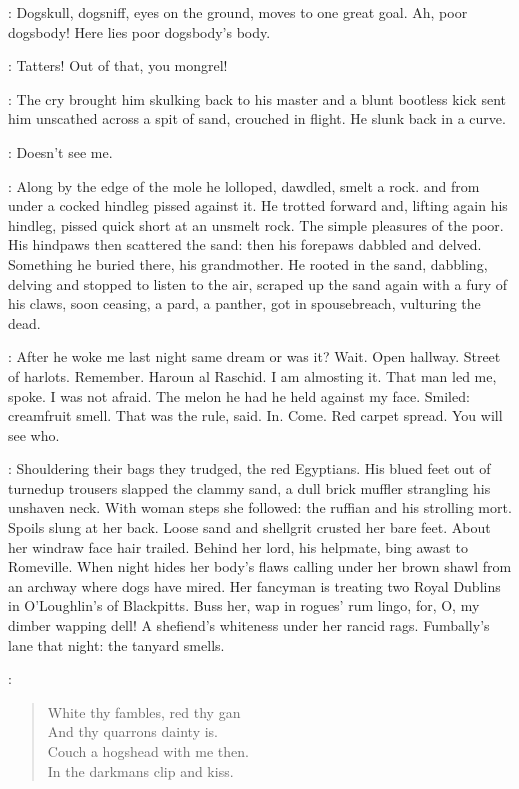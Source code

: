 \StephenInt:
Dogskull, dogsniff,
eyes on the ground,
moves to one great goal.
Ah, poor dogsbody!
Here lies poor dogsbody's body.

\man:
Tatters!
Out of that, you mongrel!

:
The cry brought him skulking back to his master
and a blunt bootless kick sent him unscathed
across a spit of sand, crouched in flight.
He slunk back in a curve.

\StephenInt:
Doesn't see me.

:
Along by the edge of the mole
he lolloped, dawdled, smelt a rock.
and from under a cocked hindleg
pissed against it.
He trotted forward and, lifting again his hindleg,
pissed quick short at an unsmelt rock.
The simple pleasures of the poor.
His hindpaws then scattered the sand:
then his forepaws dabbled and delved.
Something he buried there, his grandmother.
He rooted in the sand,
dabbling, delving
and stopped to listen to the air,
scraped up the sand
again with a fury of his claws,
soon ceasing, a pard, a panther,
got in spousebreach,
vulturing the dead.

\StephenInt:
After he woke me last night same dream or was it?
Wait.
Open hallway.
Street of harlots.
Remember.
Haroun al Raschid.
I am almosting it.
That man led me, spoke.
I was not afraid.
The melon he had he held against my face.
Smiled:
creamfruit smell.
That was the rule, said.
In.
Come.
Red carpet spread.
You will see who.

:
Shouldering their bags they trudged, the red Egyptians.
His blued feet out of turnedup trousers
slapped the clammy sand,
a dull brick muffler strangling his unshaven neck.
With woman steps she followed:
the ruffian and his strolling mort.
Spoils slung at her back.
Loose sand and shellgrit crusted her bare feet.
About her windraw face hair trailed.
Behind her lord, his helpmate, bing awast to Romeville.
When night hides her body's flaws
calling under her brown shawl from an archway where dogs have mired.
Her fancyman is treating two Royal Dublins in O'Loughlin's of Blackpitts.
Buss her, wap in rogues' rum lingo,
for, O, my dimber wapping dell!
A shefiend's whiteness under her rancid rags.
Fumbally's lane that night:
the tanyard smells.

:
\begin{verse}
    White thy fambles, red thy gan \\
    And thy quarrons dainty is. \\
    Couch a hogshead with me then. \\
    In the darkmans clip and kiss.
\end{verse}

